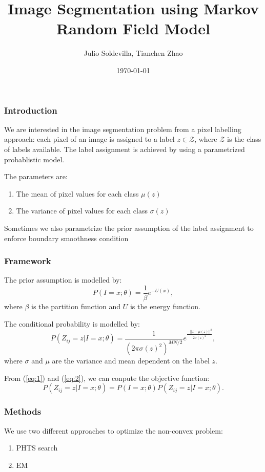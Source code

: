 \documentclass{beamer}
\title[Computer Vision]{Image Segmentation using Markov Random Field Model} %
\author{Julio Soldevilla, Tianchen Zhao} %
\institute[University of Michigan] %
{
University of Michigan \\ %
\medskip
\textit{jsolde@umich.edu ericolon@umich.edu} %
}
\date{\today} %
\begin{document}
\begin{frame}
\titlepage %
\end{frame}

\begin{frame}
\frametitle{Introduction}
We are interested in the image segmentation problem from a pixel labelling approach: each pixel of an image is assigned to a label $z \in \mathcal{Z}$, where $\mathcal{Z}$ is the class of labels available. The label assignment is achieved by using a parametrized probablistic model.

The parameters are:
\begin{enumerate}
\item The mean of pixel values for each class $\mu(z)$
\item The variance of pixel values for each class $\sigma(z)$
\end{enumerate}

Sometimes we also parametrize the prior assumption of the label assignment to enforce boundary smoothness condition


\end{frame}


\begin{frame}
\frametitle{Framework}
The prior assumption is modelled by:
\begin{equation} \label{eq:1}
P(I=x;\theta) = \frac{1}{\beta} e^{-U(x)},
\end{equation}
where $\beta$ is the partition function and $U$ is the energy function.

The conditional probability is modelled by:
\begin{equation} \label{eq:2}
P(Z_{ij}=z|I=x; \theta) = \frac{1}{(2\pi \sigma(z)^2)^{MN/2}}e^{\frac{-||x-\mu(z)||^2}{2\sigma(z)^2}},
\end{equation}
where $\sigma$ and $\mu$ are the variance and mean dependent on the label $z$.

From (\ref{eq:1}) and (\ref{eq:2}), we can conpute the objective function:
\begin{equation}
P(Z_{ij}=z|I = x; \theta) = P(I=x;\theta) P(Z_{ij}=z|I=x; \theta).
\end{equation}
\end{frame}




\begin{frame}
\frametitle{Methods}
We use two different approaches to optimize the non-convex problem:
\begin{enumerate}
\item PHTS search
\item EM
\end{enumerate}
\end{frame}
\end{document}
